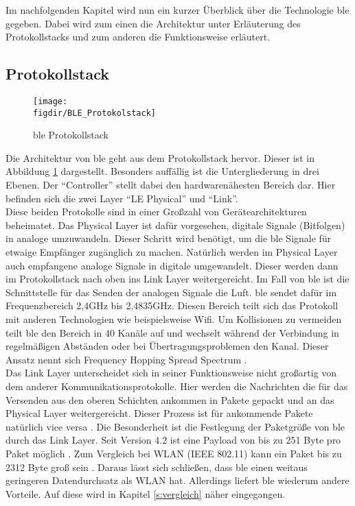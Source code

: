 \noindent Im nachfolgenden Kapitel wird nun ein kurzer Überblick über die Technologie \ac{ble} gegeben. Dabei wird zum einen die Architektur unter Erläuterung des Protokollstacks und zum anderen die Funktionsweise erläutert.\\   

\subsection{Protokollstack}
\label{ss:funktionsweise:protokollstack}

\begin{figure}[!b]
	\centering
	\texttt{[image: \\figdir/BLE\_Protokolstack]}
	\caption{\ac{ble} Protokollstack \cite[Seite 16]{Townsend14:GSB}}
	\label{FIG:protokollstack}
\end{figure}

\noindent Die Architektur von \ac{ble} geht aus dem Protokollstack hervor. Dieser ist in Abbildung \ref{FIG:protokollstack} dargestellt. Besonders auffällig ist die Untergliederung in drei Ebenen. Der "`Controller"' stellt dabei den hardwarenähesten Bereich dar. Hier befinden sich die zwei Layer "`LE Physical"' und "`Link"'.\\

\noindent Diese beiden Protokolle sind in einer Großzahl von Gerätearchitekturen beheimatet. Das Physical Layer ist dafür vorgesehen, digitale Signale (Bitfolgen) in analoge umzuwandeln. Dieser Schritt wird benötigt, um die \ac{ble} Signale für etwaige Empfänger zugänglich zu machen. Natürlich werden im Physical Layer auch empfangene analoge Signale in digitale umgewandelt. Dieser werden dann im Protokollstack nach oben ins Link Layer weitergereicht. Im Fall von \ac{ble} ist die Schnittstelle für das Senden der analogen Signale die Luft. \ac{ble} sendet dafür im Frequenzbereich 2,4GHz bis 2,4835GHz. Diesen Bereich teilt sich das Protokoll mit anderen Technologien wie beispielsweise Wifi. Um Kollisionen zu vermeiden teilt \ac{ble} den Bereich in 40 Kanäle auf und wechselt während der Verbindung in regelmäßigen Abständen oder bei Übertragungsproblemen den Kanal. Dieser Ansatz nennt sich Frequency Hopping Spread Spectrum \cite[Seite 16f]{Townsend14:GSB}.\\      

\noindent Das Link Layer unterscheidet sich in seiner Funktionsweise nicht großartig von dem anderer Kommunikationsprotokolle. Hier werden die Nachrichten die für das  Versenden aus den oberen Schichten ankommen in Pakete gepackt und an das Physical Layer weitergereicht. Dieser Prozess ist für ankommende Pakete natürlich vice versa \cite[Seit 194]{Tanenbaum14:CN}. Die Besonderheit ist die Festlegung der Paketgröße von \ac{ble} durch das Link Layer. Seit Version 4.2 ist eine Payload von bis zu 251 Byte pro Paket möglich \cite{Gupta20:WWW}. Zum Vergleich bei WLAN (IEEE 802.11) kann ein Paket bis zu 2312 Byte groß sein \cite[Seite 233]{Gessler15:WNN}. Daraus lässt sich schließen, dass \ac{ble} einen weitaus geringeren Datendurchsatz als WLAN hat. Allerdings liefert \ac{ble} wiederum andere Vorteile. Auf diese wird in Kapitel \ref{s:vergleich} näher eingegangen.\\

